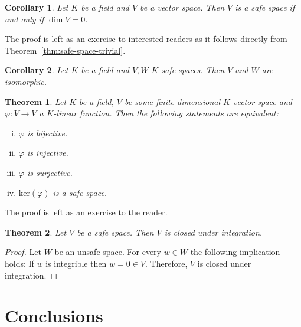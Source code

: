 \documentclass[]{article}
\newtheorem{theorem}{Theorem}
\newtheorem{corollary}{Corollary}
\begin{document}
\begin{corollary}\label{cor:safe-space-dim0}
	Let $K$ be a field and $V$ be a vector space. Then $V$ is a safe space if and only if $\dim V = 0$.
\end{corollary}
The proof is left as an exercise to interested readers as it follows directly from Theorem~\ref{thm:safe-space-trivial}.

\begin{corollary}
	Let $K$ be a field and $V, W$ $K$-safe spaces. Then $V$ and $W$ are isomorphic.
\end{corollary}

\begin{theorem}
	Let $K$ be a field, $V$ be some finite-dimensional $K$-vector space and $\varphi : V \to V$ a $K$-linear function. Then the following statements are equivalent:
	\begin{enumerate}[(i)]
		\item $\varphi$ is bijective.
		\item $\varphi$ is injective.
		\item $\varphi$ is surjective.
		\item $\text{ker}(\varphi)$ is a safe space.
	\end{enumerate}
\end{theorem}

The proof is left as an exercise to the reader.

\begin{theorem}
	Let $V$ be a safe space. Then $V$ is closed under integration.

\end{theorem}

\begin{proof}
	Let $W$ be an unsafe space. For every $w \in W$ the following implication holds: If $w$ is integrible then $w = 0 \in V$. Therefore, $V$ is closed under integration.
\end{proof}


\section{Conclusions}
\end{document}
